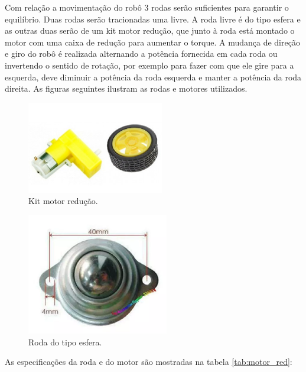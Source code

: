         	Com relação a movimentação do robô 3 rodas serão suficientes para garantir o equilíbrio. Duas rodas serão tracionadas uma livre.  A roda livre é do tipo esfera e as outras duas serão de um kit motor redução, que junto à roda está montado o motor com uma caixa de redução para aumentar o torque. A mudança de direção e giro do robô é realizada alternando a potência fornecida em cada roda ou invertendo o sentido de rotação, por exemplo para fazer com que ele gire para a esquerda, deve diminuir a potência da roda esquerda e manter a potência da roda direita. As figuras seguintes ilustram as rodas e motores utilizados.

        	\begin{figure}[H]
				\centering
				\includegraphics[scale=0.7]{figuras/motor_roda.png}
				\caption{Kit motor redução.}
				\label{img:kit_motor}
			\end{figure}

			\begin{figure}[H]
				\centering
				\includegraphics[scale=0.7]{figuras/esfera.png}
				\caption{Roda do tipo esfera.}
				\label{img:esfera}
			\end{figure}

			As especificações da roda e do motor são mostradas na tabela \ref{tab:motor_red}:

